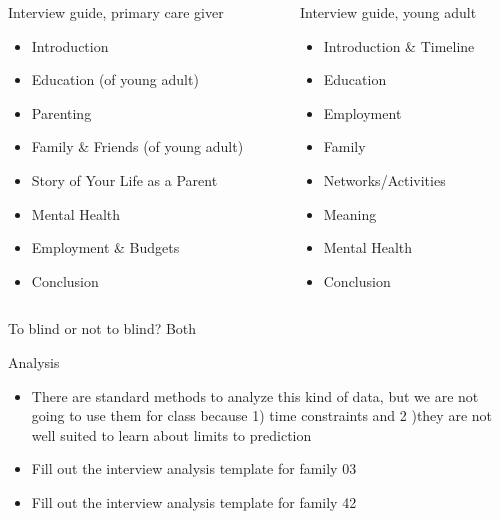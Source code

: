 \documentclass[aspectratio=169]{beamer}
\begin{document}
\begin{frame}

\begin{columns}

\begin{column}{0.5\textwidth}
Interview guide, primary care giver
\begin{itemize}
\item Introduction
\item Education (of young adult)
\item Parenting
\item Family \& Friends (of young adult)
\item Story of Your Life as a Parent
\item Mental Health
\item Employment \& Budgets
\item Conclusion
\end{itemize}
\end{column}

\pause
\begin{column}{0.5\textwidth}
Interview guide, young adult
\begin{itemize}
\item Introduction \& Timeline
\item Education 
\item Employment
\item Family
\item Networks/Activities
\item Meaning
\item Mental Health
\item Conclusion
\end{itemize}
\end{column}

\end{columns}

\end{frame}
\begin{frame}

To blind or not to blind? \pause Both

\end{frame}
\begin{frame}

\begin{center}
{\Large Analysis}
\end{center}

\end{frame}
\begin{frame}

\begin{itemize}
\item There are standard methods to analyze this kind of data, but we are not going to use them for class because 1) time constraints and 2 )they are not well suited to learn about limits to prediction 
\pause
\item Fill out the interview analysis template for family 03
\pause
\item Fill out the interview analysis template for family 42
\end{itemize}

\end{frame}
\end{document}
